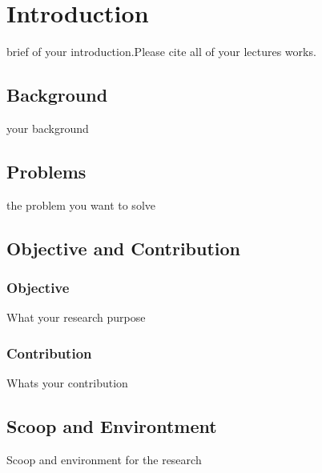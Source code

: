 \chapter{Introduction}

brief of your introduction.Please cite all of your lectures works\cite{pane2018qualitative}\cite{awangga2018k}\cite{Awangga2017}\cite{yulita2017combination}\cite{yulita2017quantization}.

\section{Background}
your background

\section{Problems}
the problem you want to solve

\section{Objective and Contribution}
\subsection{Objective}
What your research purpose

\subsection{Contribution}
Whats your contribution

\section{Scoop and Environtment}
Scoop and environment for the research



